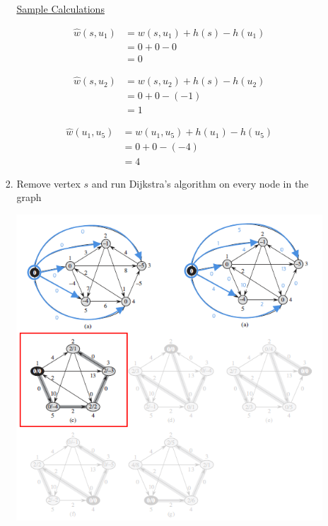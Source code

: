 \documentclass[12pt]{article}
\begin{document}
\begin{enumerate}[1.]
\begin{itemize}
\begin{enumerate}[1.]
            \bigskip

            \underline{Sample Calculations}

            \begin{align}
            \hat{w}(s, u_1) &= w(s, u_1) + h(s) - h(u_1)\\
            &= 0 + 0 - 0\\
            &= 0
            \end{align}

            \bigskip

            \begin{align}
            \hat{w}(s, u_2) &= w(s, u_2) + h(s) - h(u_2)\\
            &= 0 + 0 - (-1)\\
            &= 1
            \end{align}

            \bigskip

            \begin{align}
            \hat{w}(u_1, u_5) &= w(u_1, u_5) + h(u_1) - h(u_5)\\
            &= 0 + 0 - (-4)\\
            &= 4
            \end{align}

            \item Remove vertex $s$ and run Dijkstra's algorithm on every node in the graph

            \begin{center}
            \includegraphics[width=\linewidth]{images/worksheet_4_solution_57.png}
            \end{center}


\end{enumerate}
\end{itemize}
\end{enumerate}
\end{document}
